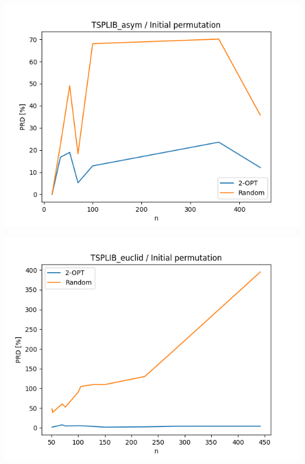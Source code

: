 \documentclass{article}
\begin{document}
\begin{center}
\includegraphics[width=\textwidth, 
                   height = 0.4\textheight, 
                   keepaspectratio]
                  {plots/tsplib_asym_2_gen_rand} 
\end{center}

\begin{center}
\includegraphics[width=\textwidth, 
                   height = 0.4\textheight, 
                   keepaspectratio]
                  {plots/tsplib_euclid_2_gen_rand} 
\end{center}
\end{document}
